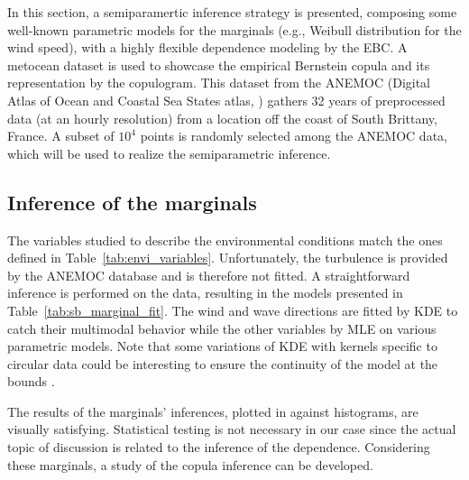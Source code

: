 In this section, a semiparamertic inference strategy is presented, composing some well-known parametric models for the marginals (e.g., Weibull distribution for the wind speed), with a highly flexible dependence modeling by the EBC. 
A metocean dataset is used to showcase the empirical Bernstein copula and its representation by the copulogram. 
This dataset from the ANEMOC (Digital Atlas of Ocean and Coastal Sea States atlas, \citealp{raoult_2018_anemoc3}) gathers 32 years of preprocessed data 
(at an hourly resolution) from a location off the coast of South Brittany, France. 
A subset of $10^4$ points is randomly selected among the ANEMOC data, which will be used to realize the semiparametric inference.


\subsection{Inference of the marginals}\label{sec:marginal_inference}

The variables studied to describe the environmental conditions match the ones defined in Table~\ref{tab:envi_variables}. 
Unfortunately, the turbulence is provided by the ANEMOC database and is therefore not fitted. 
A straightforward inference is performed on the data, resulting in the models presented in Table~\ref{tab:sb_marginal_fit}.
The wind and wave directions are fitted by KDE to catch their multimodal behavior while the other variables by MLE on various parametric models. 
Note that some variations of KDE with kernels specific to circular data could be interesting to ensure the continuity of the model at the bounds \citep{bai_1989_directional_kde}. 

The results of the marginals' inferences, plotted in  against histograms, are visually satisfying. 
Statistical testing is not necessary in our case since the actual topic of discussion is related to the inference of the dependence. 
Considering these marginals, a study of the copula inference can be developed. 


